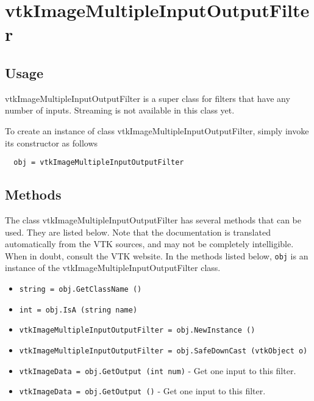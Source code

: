 \section{vtkImageMultipleInputOutputFilter}

\subsection{Usage}

 vtkImageMultipleInputOutputFilter is a super class for filters that 
 have any number of inputs. Streaming is not available in this class yet.

To create an instance of class vtkImageMultipleInputOutputFilter, simply
invoke its constructor as follows
\begin{verbatim}
  obj = vtkImageMultipleInputOutputFilter
\end{verbatim}
\subsection{Methods}

The class vtkImageMultipleInputOutputFilter has several methods that can be used.
  They are listed below.
Note that the documentation is translated automatically from the VTK sources,
and may not be completely intelligible.  When in doubt, consult the VTK website.
In the methods listed below, \verb|obj| is an instance of the vtkImageMultipleInputOutputFilter class.
\begin{itemize}
\item  \verb|string = obj.GetClassName ()|

\item  \verb|int = obj.IsA (string name)|

\item  \verb|vtkImageMultipleInputOutputFilter = obj.NewInstance ()|

\item  \verb|vtkImageMultipleInputOutputFilter = obj.SafeDownCast (vtkObject o)|

\item  \verb|vtkImageData = obj.GetOutput (int num)| -  Get one input to this filter.

\item  \verb|vtkImageData = obj.GetOutput ()| -  Get one input to this filter.

\end{itemize}
